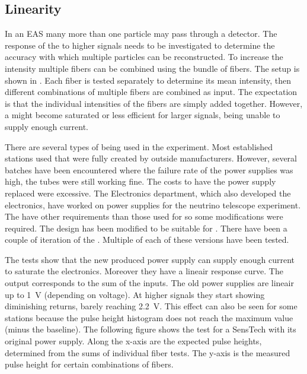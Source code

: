 \subsection{Linearity}

In an EAS many more than one particle may pass through a detector. The
response of the \pmt to higher signals needs to be investigated to
determine the accuracy with which multiple particles can be
reconstructed. To increase the intensity multiple fibers can be combined
using the bundle of fibers. The setup is shown in . Each fiber is tested separately to determine
its mean intensity, then different combinations of multiple fibers are
combined as input. The expectation is that the individual intensities of
the fibers are simply added together. However, a \pmt might become
saturated or less efficient for larger signals, being unable to supply
enough current.

There are several types of \pmt being used in the \hisparc experiment.
Most established stations used \pmts that were fully created by outside
manufacturers. However, several batches have been encountered where the
failure rate of the \pmt power supplies was high, the tubes were still
working fine. The costs to have the power supply replaced were
excessive. The \nikhef Electronics department, which also developed the
\hisparc electronics, have worked on \pmt power supplies for the \kmnet
neutrino telescope experiment. The \kmnet \pmts have other requirements
than those used for \hisparc so some modifications were required. The
\kmnet design has been modified to be suitable for \hisparc. There have
been a couple of iteration of the \hisparc \pmts. Multiple \pmts of each
of these versions have been tested.

The tests show that the new \nikhef produced \pmt power supply can
supply enough current to saturate the \hisparc electronics. Moreover
they have a lineair response curve. The output corresponds to the sum of
the inputs. The old power supplies are lineair up to \SI{1}{\volt}
(depending on voltage). At higher signals they start showing diminishing
returns, barely reaching \SI{2.2}{\volt}. This effect can also be seen
for some \hisparc stations because the pulse height histogram does not
reach the maximum \adc value (minus the baseline). The following figure
shows the test for a SensTech \pmt with its original power supply. Along
the x-axis are the expected pulse heights, determined from the sums of
individual fiber tests. The y-axis is the measured pulse height for
certain combinations of fibers.

